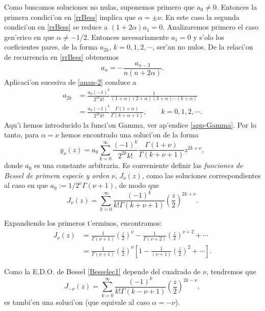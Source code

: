 Como buscamos soluciones no nulas, suponemos primero que $a_0\neq 0$. Entonces la primera condici'on en \eqref{rrBess} implica que $\alpha=\pm\nu$. En este caso la segunda condici'on en \eqref{rrBess} se reduce a $(1+2\alpha)a_1=0$. Analizaremos primero el caso gen'erico en que $\alpha\neq -1/2$. Entonces necesariamente $a_1=0$ y s'olo los coeficientes pares, de la forma $a_{2k}$, $k=0,1,2,\cdots$, ser'an no nulos. De la relaci'on de recurrencia en \eqref{rrBess} obtenemos
\begin{equation}\label{anan-2}
a_n=-\frac{a_{n-2}}{n(n+2\alpha)}.
\end{equation}
Aplicaci'on sucesiva de \eqref{anan-2} conduce a
\begin{align}
a_{2 k} &= \frac{a_0(-1)^k}{2^{2k}k!}\frac{1}{(1+\alpha)(2+\alpha)(3+\alpha)\cdots (k+\alpha)}\\
&= \frac{a_0 (-1)^k}{2^{2k} k!}\frac{\Gamma(1+\alpha)}{\Gamma(k +\alpha+ 1) }, \qquad k=0,1,2,\cdots. 
\end{align}
Aqu'i hemos introducido la funci'on Gamma, ver ap'endice \ref{app-Gamma}. Por lo tanto, para $\alpha=\nu$ hemos encontrado una soluci'on de la forma
\begin{equation}
y_\nu(z) = a_0 \sum_{k=0}^\infty \frac{(-1)^k}{2^{2k}k!}\frac{\Gamma(1+\nu)}{\Gamma(k+\nu+ 1) }
z^{2k+\nu},
\end{equation}
donde $a_0$ es una constante arbitraria. Es conveniente definir las \textit{funciones de Bessel de primera especie y orden} $\nu$, $J_\nu(z)$, como las soluciones correspondientes al caso en que $a_0:=1/2^{\nu}\Gamma(\nu+1)$, de modo que
\begin{equation}\label{Besselnu}
\boxed{J_\nu(z) = \sum_{k = 0}^\infty \frac{ (-1)^k }{ k! \Gamma(k + \nu + 1) }
\left( \frac{z}{2} \right)^{2k+\nu}.}
\end{equation}

Expandiendo los primeros t'erminos, encontramos:
\begin{align}\label{J-nu}
J_\nu(z) &= \frac{1}{\Gamma(\nu+1)}\left(\frac{z}{2}\right)^{\nu}
-\frac{1}{\Gamma(\nu+2)}\left(\frac{z}{2}\right)^{\nu+2}+ \cdots \\
&= \frac{1}{\Gamma(\nu+1)}\left(\frac{z}{2}\right)^{\nu}\left[1-\frac{1}{(\nu+1)}\left(\frac{z}{2}\right)^2+\cdots \right].
\end{align}

Como la E.D.O. de Bessel \eqref{Besselec1} depende del cuadrado de $\nu$, tendremos que 
\begin{equation}
J_{-\nu}(z) = \sum_{k = 0}^\infty \frac{ (-1)^k }{ k! \Gamma(k-\nu+1) }
\left( \frac{z}{2} \right)^{2k-\nu},
\end{equation}
es tambi'en una soluci'on (que equivale al caso $\alpha=-\nu$). 

